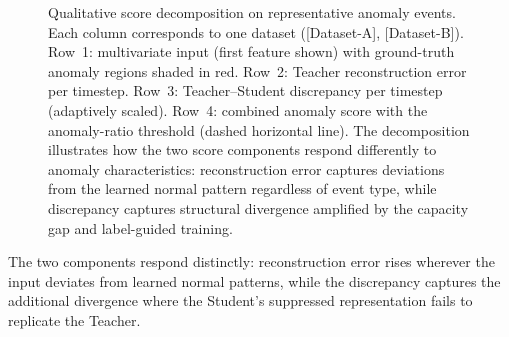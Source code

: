 \begin{figure}[tbp]
  \centering
  \caption{Qualitative score decomposition on representative anomaly events.
    Each column corresponds to one dataset ([Dataset-A], [Dataset-B]).
    Row~1: multivariate input (first feature shown) with ground-truth anomaly regions shaded in
    red.
    Row~2: Teacher reconstruction error per timestep.
    Row~3: Teacher--Student discrepancy per timestep (adaptively scaled).
    Row~4: combined anomaly score with the anomaly-ratio threshold (dashed horizontal line).
    The decomposition illustrates how the two score components respond differently to anomaly
    characteristics: reconstruction error captures deviations from the learned normal pattern
    regardless of event type, while discrepancy captures structural divergence amplified by the
    capacity gap and label-guided training.}
  \label{fig:decomp}
\end{figure}

The two components respond distinctly: reconstruction error rises wherever the input deviates from
learned normal patterns, while the discrepancy captures the additional divergence where the
Student's suppressed representation fails to replicate the Teacher.

\BodyFloatBarrier

